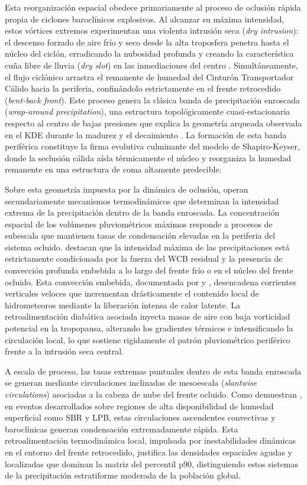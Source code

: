 Esta reorganización espacial obedece primariamente al proceso de oclusión rápida propia de ciclones baroclínicos explosivos. Al alcanzar su máxima intensidad, estos vórtices extremos experimentan una violenta intrusión seca (\textit{dry intrusion}): el descenso forzado de aire frío y seco desde la alta troposfera penetra hasta el núcleo del ciclón, erradicando la nubosidad profunda y creando la característica cuña libre de lluvia (\textit{dry slot}) en las inmediaciones del centro \citep{shapiro1999}. Simultáneamente, el flujo ciclónico arrastra el remanente de humedad del Cinturón Transportador Cálido hacia la periferia, confinándolo estrictamente en el frente retrocedido (\textit{bent-back front}). Este proceso genera la clásica banda de precipitación enroscada (\textit{wrap-around precipitation}), una estructura topológicamente cuasi-estacionaria respecto al centro de bajas presiones que explica la geometría arqueada observada en el KDE durante la madurez y el decaimiento \citep{schultz2021antecedents}. La formación de esta banda periférica constituye la firma evolutiva culminante del modelo de Shapiro-Keyser, donde la seclusión cálida aísla térmicamente el núcleo y reorganiza la humedad remanente en una estructura de coma altamente predecible.

Sobre esta geometría impuesta por la dinámica de oclusión, operan secundariamente mecanismos termodinámicos que determinan la intensidad extrema de la precipitación dentro de la banda enroscada. La concentración espacial de los volúmenes pluviométricos máximos responde a procesos de subescala que mantienen tasas de condensación elevadas en la periferia del sistema ocluido. \citet{priestley2022improved} destacan que la intensidad máxima de las precipitaciones está estrictamente condicionada por la fuerza del WCB residual y la presencia de convección profunda embebida a lo largo del frente frío o en el núcleo del frente ocluido. Esta convección embebida, documentada por \citet{oertel2021warm} y \citet{blanchard2021warm}, desencadena corrientes verticales veloces que incrementan drásticamente el contenido local de hidrometeoros mediante la liberación intensa de calor latente. La retroalimentación diabática asociada inyecta masas de aire con baja vorticidad potencial en la tropopausa, alterando los gradientes térmicos e intensificando la circulación local, lo que sostiene rigidamente el patrón pluviométrico periférico frente a la intrusión seca central.

A escala de proceso, las tasas extremas puntuales dentro de esta banda enroscada se generan mediante circulaciones inclinadas de mesoescala (\textit{slantwise circulations}) asociadas a la cabeza de nube del frente ocluido. Como demuestran \citet{clark2005sting}, en eventos desarrollados sobre regiones de alta disponibilidad de humedad superficial como SBR y LPB, estas circulaciones ascendentes convectivas y baroclínicas generan condensación extremadamente rápida. Esta retroalimentación termodinámica local, impulsada por inestabilidades dinámicas en el entorno del frente retrocedido, justifica las densidades espaciales agudas y localizadas que dominan la matriz del percentil p90, distinguiendo estos sistemas de la precipitación estratiforme moderada de la población global.

